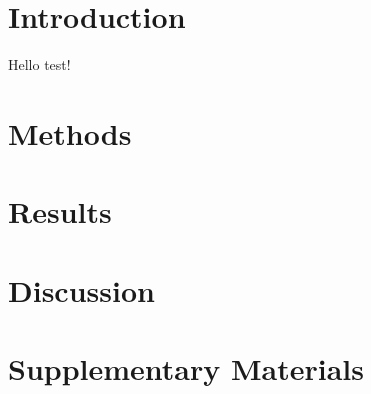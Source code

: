 \documentclass[
  12pt,
]{article}
\begin{document}
\hypertarget{introduction}{%
\section{Introduction}\label{introduction}}

Hello test!

\hypertarget{methods}{%
\section{Methods}\label{methods}}

\hypertarget{results}{%
\section{Results}\label{results}}

\hypertarget{discussion}{%
\section{Discussion}\label{discussion}}

\hypertarget{supplementary-materials}{%
\section{Supplementary Materials}\label{supplementary-materials}}

  
\end{document}

